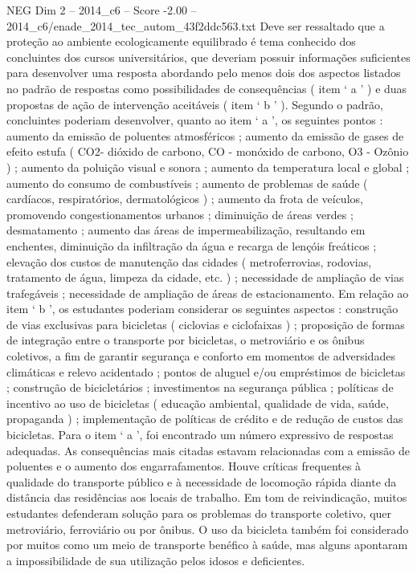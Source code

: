 \begin{textsample}{NEG Dim 2 – 2014\_c6 – Score -2.00 – 2014\_c6/enade\_2014\_tec\_autom\_43f2ddc563.txt}
Deve ser ressaltado que a proteção ao ambiente ecologicamente equilibrado é tema conhecido dos concluintes dos cursos universitários, que deveriam possuir informações suficientes para desenvolver uma resposta abordando pelo menos dois dos aspectos listados no padrão de respostas como possibilidades de consequências ( item ‘ a ’ ) e duas propostas de ação de intervenção aceitáveis ( item ‘ b ’ ).
Segundo o padrão, concluintes poderiam desenvolver, quanto ao item ‘ a ’, os seguintes pontos : aumento da emissão de poluentes atmosféricos ; aumento da emissão de gases de efeito estufa ( CO2- dióxido de carbono, CO - monóxido de carbono, O3 - Ozônio ) ; aumento da poluição visual e sonora ; aumento da temperatura local e global ; aumento do consumo de combustíveis ; aumento de problemas de saúde ( cardíacos, respiratórios, dermatológicos ) ; aumento da frota de veículos, promovendo congestionamentos urbanos ; diminuição de áreas verdes ; desmatamento ; aumento das áreas de impermeabilização, resultando em enchentes, diminuição da infiltração da água e recarga de lençóis freáticos ; elevação dos custos de manutenção das cidades ( metroferrovias, rodovias, tratamento de água, limpeza da cidade, etc. ) ; necessidade de ampliação de vias trafegáveis ; necessidade de ampliação de áreas de estacionamento.
Em relação ao item ‘ b ’, os estudantes poderiam considerar os seguintes aspectos : construção de vias exclusivas para bicicletas ( ciclovias e ciclofaixas ) ; proposição de formas de integração entre o transporte por bicicletas, o metroviário e os ônibus coletivos, a fim de garantir segurança e conforto em momentos de adversidades climáticas e relevo acidentado ; pontos de aluguel e/ou empréstimos de bicicletas ; construção de bicicletários ; investimentos na segurança pública ; políticas de incentivo ao uso de bicicletas ( educação ambiental, qualidade de vida, saúde, propaganda ) ; implementação de políticas de crédito e de redução de custos das bicicletas.
Para o item ‘ a ’, foi encontrado um número expressivo de respostas adequadas.
As consequências mais citadas estavam relacionadas com a emissão de poluentes e o aumento dos engarrafamentos.
Houve críticas frequentes à qualidade do transporte público e à necessidade de locomoção rápida diante da distância das residências aos locais de trabalho.
Em tom de reivindicação, muitos estudantes defenderam solução para os problemas do transporte coletivo, quer metroviário, ferroviário ou por ônibus.
O uso da bicicleta também foi considerado por muitos como um meio de transporte benéfico à saúde, mas alguns apontaram a impossibilidade de sua utilização pelos idosos e deficientes.

\end{textsample}
